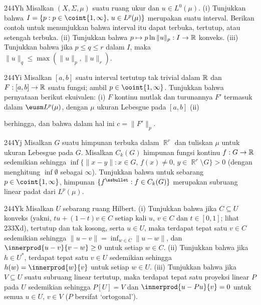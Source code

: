 {\spheader 244Yh
Misalkan $(X,\Sigma,\mu)$ suatu ruang ukur dan $u\in L^0(\mu)$.
(i) Tunjukkan bahwa
$I=\{p:p\in\coint{1,\infty},\,u\in L^p(\mu)\}$ merupakan suatu
interval. Berikan contoh untuk menunjukkan bahwa interval itu dapat
terbuka, tertutup, atau setengah terbuka. (ii) Tunjukkan bahwa
$p\mapsto p\ln\|u\|_p:I\to\Bbb R$ konveks. 
(iii) Tunjukkan bahwa jika $p\le q\le r$ dalam $I$, maka
$\|u\|_q\le\max(\|u\|_p,\|u\|_r)$.

\spheader 244Yi
Misalkan $[a,b]$ suatu interval tertutup tak trivial dalam $\Bbb R$ dan
$F:[a,b]\to\Bbb R$ suatu fungsi; ambil $p\in\ooint{1,\infty}$.
Tunjukkan bahwa pernyataan berikut ekuivalen: (i) $F$ kontinu mutlak dan
turunannya $F'$ termasuk dalam $\eusm L^p(\mu)$, dengan $\mu$ ukuran
Lebesgue pada $[a,b]$ (ii)


\noindent berhingga, dan bahwa dalam hal ini $c=\|F'\|_p$.

\spheader 244Yj
Misalkan $G$ suatu himpunan terbuka dalam $\BbbR^r$ dan tuliskan $\mu$
untuk ukuran Lebesgue pada $G$. Misalkan $C_k(G)$ himpunan fungsi kontinu
$f:G\to\Bbb R$ sedemikian sehingga
$\inf\{\|x-y\|:x\in G,\,f(x)\ne 0,\,y\in\BbbR^r\setminus G\}>0$
(dengan menghitung $\inf\emptyset$ sebagai $\infty$).
Tunjukkan bahwa untuk sebarang $p\in\coint{1,\infty}$, himpunan
$\{f^{\ssbullet}:f\in C_k(G)\}$ merupakan subruang linear padat dari
$L^p(\mu)$.

\spheader 244Yk
Misalkan $U$ sebarang ruang Hilbert. (i) Tunjukkan bahwa jika
$C\subseteq U$ konveks (yakni, $tu+(1-t)v\in C$ setiap kali
$u$, $v\in C$ dan $t\in[0,1]$; lihat 233Xd), tertutup dan tak kosong,
serta $u\in U$, maka terdapat tepat satu $v\in C$ sedemikian sehingga
$\|u-v\|=\inf_{w\in C}\|u-w\|$, dan $\innerprod{u-v}{v-w}\ge 0$ untuk
setiap $w\in C$. (ii) Tunjukkan bahwa jika $h\in U^*$, terdapat tepat
satu $v\in U$ sedemikian sehingga $h(w)=\innerprod{w}{v}$ untuk setiap
$w\in U$. 
(iii) Tunjukkan bahwa jika $V\subseteq U$ suatu subruang linear tertutup,
maka terdapat tepat satu proyeksi linear $P$ pada $U$ sedemikian sehingga
$P[U]=V$ dan $\innerprod{u-Pu}{v}=0$ untuk semua $u\in U$, $v\in V$
($P$ bersifat `ortogonal'). 

}
